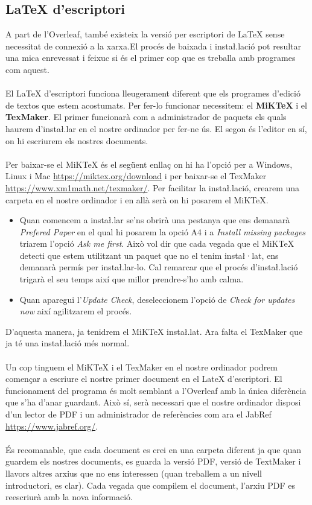 \documentclass[12pm,twosides,onecolumn,openany]{book}
\begin{document}
\subsection{LaTeX d'escriptori}
A part de l'Overleaf, també existeix la versió per escriptori de LaTeX sense necessitat de connexió a la xarxa.El procés de baixada i insta\l.lació pot resultar una mica enrevessat i feixuc si és el primer cop que es treballa amb programes com aquest.\\\\
El LaTeX d'escriptori funciona lleugerament diferent que els programes d'edició de textos que estem acostumats. Per fer-lo funcionar necessitem: el \textbf{MiKTeX} i el \textbf{TexMaker}. 
El primer funcionarà com a administrador de paquets els quals haurem d'insta\l.lar en el nostre ordinador per fer-ne ús. El segon és l'editor en sí, on hi escriurem els nostres documents.\\\\
Per baixar-se el MiKTeX és el següent enllaç on hi ha l'opció per a Windows, Linux i Mac \url{https://miktex.org/download} i per baixar-se el TexMaker \url{https://www.xm1math.net/texmaker/}. Per facilitar la insta\l.lació, crearem una carpeta en el nostre ordinador i en allà serà on hi posarem el MiKTeX.
\begin{itemize}
    \item Quan comencem a insta\l.lar se'ns obrirà una pestanya que ens demanarà \textit{Prefered Paper} en el qual hi posarem la opció A4 i a \textit{Install missing packages} triarem l'opció \textit{Ask me first}. Això vol dir que cada vegada que el MiKTeX detecti que estem utilitzant un paquet que no el tenim insta\l·lat, ens demanarà permís per insta\l.lar-lo. Cal remarcar que el procés d'insta\l.lació trigarà el seu temps així que millor prendre-s'ho amb calma.
    \item Quan aparegui l'\textit{Update Check}, deseleccionem l'opció de \textit{Check for updates now} així agilitzarem el procés. 
\end{itemize}
D'aquesta manera, ja tenidrem el MiKTeX insta\l.lat. Ara falta el TexMaker que ja té una insta\l.lació més normal.\\\\
Un cop tinguem el MiKTeX i el TexMaker en el nostre ordinador podrem començar a escriure el nostre primer document en el LateX d'escriptori. El funcionament del programa
és molt semblant a l'Overleaf amb la única diferència que s'ha d'anar guardant. Això sí, serà necessari que el nostre ordinador disposi d'un lector de PDF i un administrador de referències com ara el JabRef \url{https://www.jabref.org/}.\\\\
És recomanable, que cada document es crei en una carpeta diferent ja que quan guardem els nostres documents, es guarda la versió PDF, versió de TextMaker i llavors altres arxius que no ens interessen (quan treballem a un nivell introductori, es clar). Cada vegada que compilem el document, l'arxiu PDF es reescriurà amb la nova informació.
\end{document}

